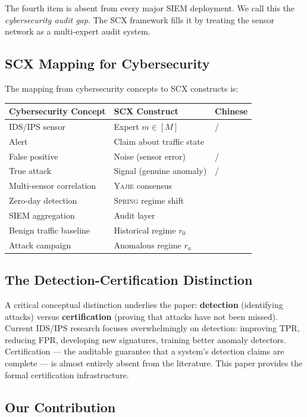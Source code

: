 \documentclass[11pt,a4paper]{article}
\theoremstyle{definition}
\theoremstyle{remark}
\newcommand{\SCX}{\textsc{SCX}}
\newcommand{\Yajie}{\textsc{Yajie}}
\newcommand{\Spring}{\textsc{Spring}}
\begin{document}
The fourth item is absent from every major SIEM deployment. We call this the \textit{cybersecurity audit gap}. The \SCX{} framework fills it by treating the sensor network as a multi-expert audit system.

\subsection{SCX Mapping for Cybersecurity}

The mapping from cybersecurity concepts to SCX constructs is:

\begin{center}
\begin{tabular}{lll}
\toprule
\textbf{Cybersecurity Concept} & \textbf{SCX Construct} & \textbf{Chinese} \\
\midrule
IDS/IPS sensor & Expert $m \in [M]$ & / \\
Alert & Claim about traffic state &  \\
False positive & Noise (sensor error) & / \\
True attack & Signal (genuine anomaly) & / \\
Multi-sensor correlation & \Yajie{} consensus &  \\
Zero-day detection & \Spring{} regime shift &  \\
SIEM aggregation & Audit layer &  \\
Benign traffic baseline & Historical regime $r_0$ &  \\
Attack campaign & Anomalous regime $r_a$ &  \\
\bottomrule
\end{tabular}
\end{center}

\subsection{The Detection-Certification Distinction}

A critical conceptual distinction underlies the paper: \textbf{detection} (identifying attacks) versus \textbf{certification} (proving that attacks have not been missed). Current IDS/IPS research focuses overwhelmingly on detection: improving TPR, reducing FPR, developing new signatures, training better anomaly detectors. Certification — the auditable guarantee that a system's detection claims are complete — is almost entirely absent from the literature. This paper provides the formal certification infrastructure.

\subsection{Our Contribution}
\end{document}
